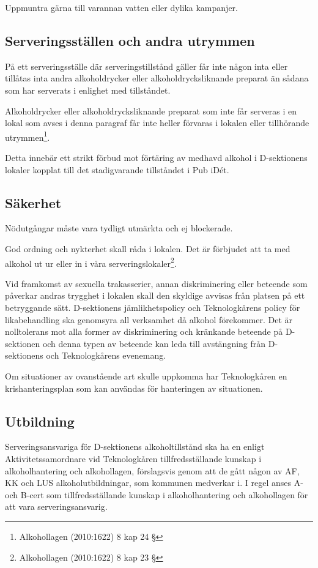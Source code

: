 \documentclass[]{dsekkallelse}
\begin{document}
Uppmuntra gärna till varannan vatten eller dylika kampanjer.

\subsection{Serveringsställen och andra utrymmen}
På ett serveringsställe där serveringstillstånd gäller får inte någon inta eller tillåtas inta andra
alkoholdrycker eller alkoholdrycksliknande preparat än sådana som har serverats i enlighet
med tillståndet.

Alkoholdrycker eller alkoholdrycksliknande preparat som inte får serveras i en lokal som
avses i denna paragraf får inte heller förvaras i lokalen eller tillhörande utrymmen\footnote{Alkohollagen (2010:1622) 8 kap 24 §}.

Detta innebär ett strikt förbud mot förtäring av medhavd alkohol i D-sektionens lokaler
kopplat till det stadigvarande tillståndet i Pub iDét.

\subsection{Säkerhet}
Nödutgångar måste vara tydligt utmärkta och ej blockerade.

God ordning och nykterhet skall råda i lokalen. Det är förbjudet att ta med alkohol ut ur eller in i våra serveringslokaler\footnote{Alkohollagen (2010:1622) 8 kap 23 §}.

Vid framkomst av sexuella trakasserier, annan diskriminering eller beteende som påverkar
andras trygghet i lokalen skall den skyldige avvisas från platsen på ett betryggande sätt.
D-sektionens jämlikhetspolicy och Teknologkårens policy för likabehandling ska genomsyra all verksamhet då alkohol förekommer. Det är nolltolerans mot alla former av diskriminering och kränkande beteende på D-sektionen och denna typen av beteende kan leda till avstängning från
D-sektionens och Teknologkårens evenemang.

Om situationer av ovanstående art skulle uppkomma har Teknologkåren en krishanteringsplan som kan användas för hanteringen av situationen.

\subsection{Utbildning}
Serveringsansvariga för D-sektionens alkoholtillstånd ska ha en enligt Aktivitetssamordnare vid Teknologkåren tillfredsställande kunskap i alkoholhantering och alkohollagen, förslagsvis genom att de gått någon av AF, KK och LUS alkoholutbildningar, som kommunen medverkar i. I regel anses A- och B-cert som tillfredsställande kunskap i alkoholhantering och alkohollagen för att vara serveringsansvarig.
\end{document}
